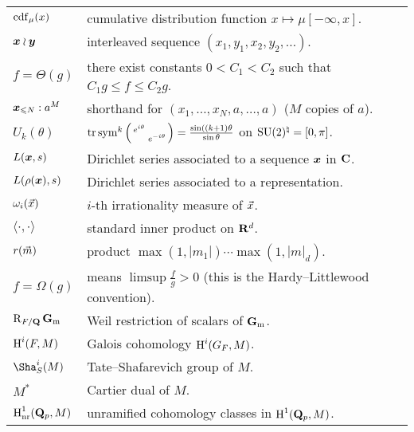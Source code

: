 \documentclass[phd,tocprelim]{cornell}
\begin{document}
\begin{tabular}{ll}
$\operatorname{cdf}_\mu(x)$
	& cumulative distribution function $x\mapsto \mu[-\infty,x]$. \\	
${\boldsymbol x}\wr{\boldsymbol y}$
	& interleaved sequence $(x_1,y_1,x_2,y_2,\dots)$. \\
$f = \Theta(g)$
	& there exist constants $0 < C_1 < C_2$ such that $C_1 g \leqslant f \leqslant C_2 g$. \\
${\boldsymbol x}_{\leqslant N} : a^M$
	& shorthand for $(x_1,\dots,x_N,a,\dots,a)$ ($M$ copies of $a$). \\
$U_k(\theta)$
	& $\operatorname{tr}\operatorname{sym}^k\left(\begin{smallmatrix} e^{i\theta} &  \\  & e^{-i\theta} \end{smallmatrix}\right) = \frac{\sin((k+1)\theta}{\sin\theta}$ on $\operatorname{SU}(2)^\natural = [0,\pi]$. \\
$L({\boldsymbol x},s)$
	& Dirichlet series associated to a sequence ${\boldsymbol x}$ in $\mathbf{C}$. \\
$L(\rho({\boldsymbol x}),s)$
	& Dirichlet series associated to a representation. \\
$\omega_i(\vec{x})$
	& $i$-th irrationality measure of $\vec{x}$. \\
$\langle \cdot,\cdot\rangle$
	& standard inner product on $\mathbf{R}^d$. \\
$r(\vec{m})$
	& product $\max(1,|m_1|) \cdots \max(1,|m|_d)$. \\
$f = \Omega(g)$
	& means $\limsup \frac f g > 0$ (this is the Hardy--Littlewood convention). \\
$\operatorname{R}_{F/\mathbf{Q}} \mathbf{G}_\mathrm{m}$
	& Weil restriction of scalars of $\mathbf{G}_\mathrm{m}$. \\
$\operatorname{H}^i(F,M)$
	& Galois cohomology $\operatorname{H}^i(G_F,M)$. \\
$\Sha^i_S(M)$
	& Tate--Shafarevich group of $M$. \\
$M^\ast$
	& Cartier dual of $M$. \\
$\operatorname{H}_{\mathrm{nr}}^1(\mathbf{Q}_p,M)$
	& unramified cohomology classes in $\operatorname{H}^1(\mathbf{Q}_p,M)$. 
\end{tabular}
\newpage





\normalspacing
\setcounter{page}{1}
\pagestyle{cornell}
\addtolength{\parskip}{0.5\baselineskip}

















\end{document}
